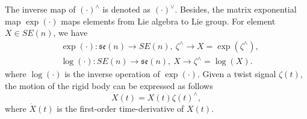 \documentclass[lettersize,journal]{IEEEtran}
\begin{document}
The inverse map of $(\cdot)^{\wedge}$ is denoted as $(\cdot)^{\vee}$. Besides, the matrix exponential map $\exp(\cdot)$ maps elements from Lie algebra to Lie group. For element $X \in SE(n)$, we have
\begin{align*}
    &\operatorname{exp}(\cdot): \mathfrak{se}(n) \rightarrow SE(n), ~\zeta^{\wedge}\rightarrow X = \exp(\zeta^{\wedge}),\\
     &\operatorname{log}(\cdot): SE(n) \rightarrow \mathfrak{se}(n), ~X\rightarrow \zeta^{\wedge} = \log(X) .
\end{align*}
where $\log(\cdot)$ is the inverse operation of $\exp(\cdot)$. Given a twist signal $\zeta(t)$, the motion of the rigid body can be expressed as follows
\begin{equation}\label{rigid-body-dyns}
    \dot{X}(t) = X(t) \zeta(t)^{\wedge},
\end{equation}
where $\dot{X}(t)$ is the first-order time-derivative of $X(t)$.
\end{document}
